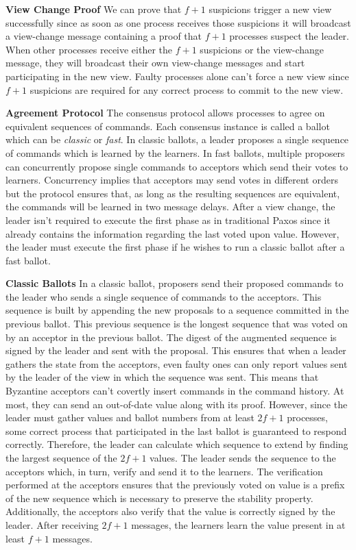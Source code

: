 \textbf{View Change Proof} We can prove that $f+1$ suspicions trigger a new view successfully since as soon as one process receives those suspicions it will broadcast a view-change message containing a proof that $f+1$ processes suspect the leader. When other processes receive either the $f+1$ suspicions or the view-change message, they will broadcast their own view-change messages and start participating in the new view. Faulty processes alone can't force a new view since $f+1$ suspicions are required for any correct process to commit to the new view.\par
\textbf{Agreement Protocol} The consensus protocol allows processes to agree on equivalent sequences of commands. Each consensus instance is called a ballot which can be \textit{classic} or \textit{fast}. In classic ballots, a leader proposes a single sequence of commands which is learned by the learners. In fast ballots, multiple proposers can concurrently propose single commands to acceptors which send their votes to learners. Concurrency implies that acceptors may send votes in different orders but the protocol ensures that, as long as the resulting sequences are equivalent, the commands will be learned in two message delays. After a view change, the leader isn't required to execute the first phase as in traditional Paxos since it already contains the information regarding the last voted upon value. However, the leader must execute the first phase if he wishes to run a classic ballot after a fast ballot. \par
\textbf{Classic Ballots} In a classic ballot, proposers send their proposed commands to the leader who sends a single sequence of commands to the acceptors. This sequence is built by appending the new proposals to a sequence committed in the previous ballot. This previous sequence is the longest sequence that was voted on by an acceptor in the previous ballot. The digest of the augmented sequence is signed by the leader and sent with the proposal. This ensures that when a leader gathers the state from the acceptors, even faulty ones can only report values sent by the leader of the view in which the sequence was sent. This means that Byzantine acceptors can't covertly insert commands in the command history. At most, they can send an out-of-date value along with its proof. However, since the leader must gather values and ballot numbers from at least $2f+1$ processes, some correct process that participated in the last ballot is guaranteed to respond correctly. Therefore, the leader can calculate which sequence to extend by finding the largest sequence of the $2f+1$ values. The leader sends the sequence to the acceptors which, in turn, verify and send it to the learners. The verification performed at the acceptors ensures that the previously voted on value is a prefix of the new sequence which is necessary to preserve the stability property. Additionally, the acceptors also verify that the value is correctly signed by the leader. After receiving $2f+1$ messages, the learners learn the value present in at least $f+1$ messages. \par
